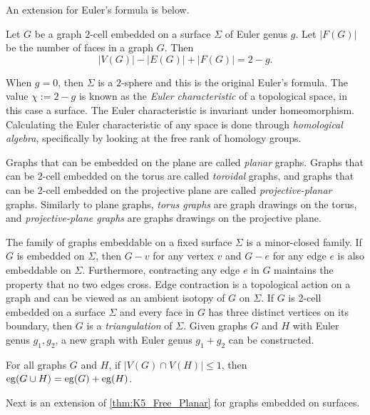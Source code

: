 An extension for Euler's formula is below. 

\begin{theorem}
	Let $G$ be a graph $2$-cell embedded on a surface $\Sigma$ of Euler genus $g$. Let \(|F(G)|\) be the number of faces in a graph \(G\). Then \[|V(G)| - |E(G)| + |F(G)| = 2 - g.\] 
\end{theorem}

When $g = 0$, then $\Sigma$ is a $2$-sphere and this is the original Euler's formula. 
The value $\chi := 2-g$ is known as the \textit{Euler characteristic} of a topological space, in this case a surface. The Euler characteristic is invariant under homeomorphism. Calculating the Euler characteristic of any space is done through \textit{homological algebra}, specifically by looking at the free rank of homology groups. 

Graphs that can be embedded on the plane are called \textit{planar} graphs. Graphs that can be 2-cell embedded on the torus are called \textit{toroidal} graphs, and graphs that can be 2-cell embedded on the projective plane are called \textit{projective-planar} graphs. Similarly to plane graphs, \textit{torus graphs} are graph drawings on the torus, and \textit{projective-plane graphs} are graphs drawings on the projective plane. 

The family of graphs embeddable on a fixed surface $\Sigma$ is a minor-closed family. If $G$ is embedded on $\Sigma$, then $G - v$ for any vertex $v$ and $G - e$ for any edge $e$ is also embeddable on $\Sigma$. Furthermore, contracting any edge $e$ in $G$ maintains the property that no two edges cross. Edge contraction is a topological action on a graph and can be viewed as an ambient isotopy of $G$ on $\Sigma$. 
If $G$ is 2-cell embedded on a surface $\Sigma$ and every face in $G$ has three distinct vertices on its boundary, then $G$ is a \textit{triangulation} of $\Sigma$. Given graphs $G$ and $H$ with Euler genus $g_1, g_2$, a new graph with Euler genus $g_1 + g_2$ can be constructed.
\begin{theorem}\label{thm:additivity_genus}
	For all graphs $G$ and $H$, if $|V(G) \cap V(H)| \leq 1$, then $\operatorname{eg}(G \cup H) = \operatorname{eg}(G) + \operatorname{eg}(H)$. 
\end{theorem}

Next is an extension of \cref{thm:K5_Free_Planar} for graphs embedded on surfaces. 

